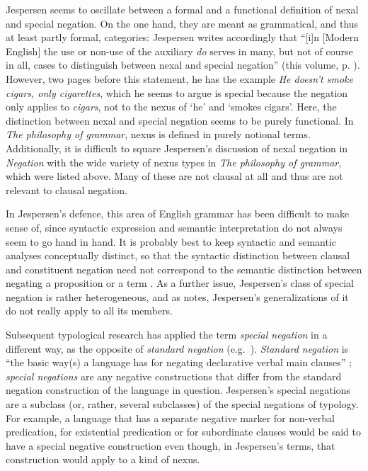 \documentclass[output=chapter]{langscibook}
\begin{document}
Jespersen seems to oscillate between a formal and a functional definition of nexal and special negation. On the one hand, they are meant as grammatical, and thus at least partly formal, categories: Jespersen writes accordingly that ``[i]n [Modern English] the use or non-use of the auxiliary \textit{do} serves in many, but not of course in all, cases to distinguish between nexal and special negation'' (this volume, p. \pageref{p:nexal-sp}). However, two pages before this statement, he has the example \textit{He doesn’t smoke cigars, only cigarettes}, which he seems to argue is special because the negation only applies to \textit{cigars}, not to the nexus of `he’ and `smokes cigars’. Here, the distinction between nexal and special negation seems to be purely functional. In \textit{The philosophy of grammar}, nexus is defined in purely notional terms. Additionally, it is difficult to square Jespersen’s discussion of nexal negation in \textit{Negation} with the wide variety of nexus types in \textit{The philosophy of grammar}, which were listed above. Many of these are not clausal at all and thus are not relevant to %
clausal negation.

In Jespersen’s defence, this area of English grammar has been difficult to make sense of, since syntactic expression and semantic interpretation do not always seem to go hand in hand. It is probably best to keep syntactic and semantic analyses conceptually distinct, so that the syntactic distinction between clausal and constituent negation need not correspond to the semantic distinction between negating a proposition or a term \citep[cf.][]{Klima1964}. As a further issue, Jespersen’s class of special negation is rather heterogeneous, and as \citet[33]{McCawley1995} notes, Jespersen’s generalizations of it do not really apply to all its members.

Subsequent typological research has applied the term \textit{special negation} in a different way, as the opposite of \textit{standard negation} (e.g.\ \citealp{Veselinova2013}). \textit{Standard negation} is ``the basic way(s) a language has for negating declarative verbal main clauses'' \citep[1]{Miestamo2005}; \textit{special negations} are any negative constructions that differ from the standard negation construction of the language in question. \mbox{Jespersen’s} special negations are a subclass (or, rather, several subclasses) of the special negations of typology. For example, a language that has a separate negative marker for non-verbal predication, for existential predication or for subordinate clauses \citep[see][]{Miestamo2017} would be said to have a special negative construction even though, in Jespersen’s terms, that construction would apply to a kind of nexus.
\end{document}

